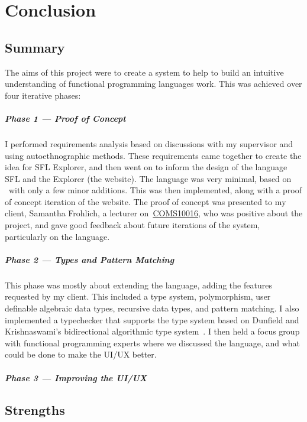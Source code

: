 \chapter{Conclusion}
\label{chap:conclusion}
\section{Summary}
The aims of this project were to create a system to help to build an intuitive understanding of functional programming languages work. This was achieved over four iterative phases:
\paragraph{Phase 1 --- Proof of Concept} I performed requirements analysis based on discussions with my supervisor and using autoethnographic methods. These requirements came together to create the idea for SFL Explorer, and then went on to inform the design of the language \ac{SFL} and the Explorer (the website). The language was very minimal, based on \lcalc~with only a few minor additions. This was then implemented, along with a proof of concept iteration of the website. The proof of concept was presented to my client, Samantha Frohlich, a lecturer on~\hyperref[COMS10016]{COMS10016}, who was positive about the project, and gave good feedback about future iterations of the system, particularly on the language. 
\paragraph{Phase 2 --- Types and Pattern Matching} This phase was mostly about extending the language, adding the features requested by my client. This included a type system, polymorphism, user definable algebraic data types, recursive data types, and pattern matching. I also implemented a typechecker that supports the type system based on Dunfield and Krishnaswami's bidirectional algorithmic type system~\cite{completebidir}. I then held a focus group with functional programming experts where we discussed the language, and what could be done to make the UI/UX better. 
\paragraph{Phase 3 --- Improving the UI/UX} 

\section{Strengths}
